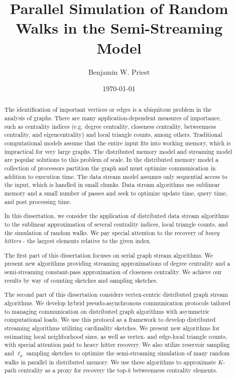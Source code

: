 \documentclass[10]{article}
\title{Parallel Simulation of Random Walks in the Semi-Streaming Model}
\author{Benjamin W. Priest}
\date{\today} %
\begin{document}
\maketitle


\begin{abstract}
The identification of important vertices or edges is a ubiquitous problem in the analysis of graphs.
There are many application-dependent measures of importance, such as centrality indices (e.g. degree centrality, closeness centrality, betweenness centrality, and eigencentrality) and local triangle counts, among others.
Traditional computational models assume that the entire input fits into working memory, which is impractical for very large graphs.
The distributed memory model and streaming model are popular solutions to this problem of scale.
In the distributed memory model a collection of processors partition the graph and must optimize communication in addition to execution time.
The data stream model assumes only sequential access to the input, which is handled in small chunks.
Data stream algorithms use sublinear memory and a small number of passes and seek to optimize update time, query time, and post processing time.  

In this dissertation, we consider the application of distributed data stream algorithms to the sublinear approximation of several centrality indices, local triangle counts, and the simulation of random walks. 
We pay special attention to the recovery of \emph{heavy hitters} - the largest elements relative to the given index.

The first part of this dissertation focuses on serial graph stream algorithms.
We present new algorithms providing streaming approximations of degree centrality and a semi-streaming constant-pass approximation of closeness centrality.
We achieve our results by way of counting sketches and sampling sketches.

The second part of this dissertation considers vertex-centric distributed graph stream algorithms.
We develop hybrid pseudo-asynchronous communication protocols tailored to managing communication on distributed graph algorithms with asymmetric computational loads.
We use this protocol as a framework to develop distributed streaming algorithms utilizing cardinality sketches.
We present new algorithms for estimating local neighborhood sizes, as well as vertex- and edge-local triangle counts, with special attention paid to heavy hitter recovery.
We also utilize reservoir sampling and $\ell_p$ sampling sketches to optimize the semi-streaming simulation of many random walks in parallel in distributed memory.
We use these algorithms to approximate  $K$-path centrality as a proxy for recovery the top-$k$ betweenness centrality elements.


\end{abstract}
\end{document}
